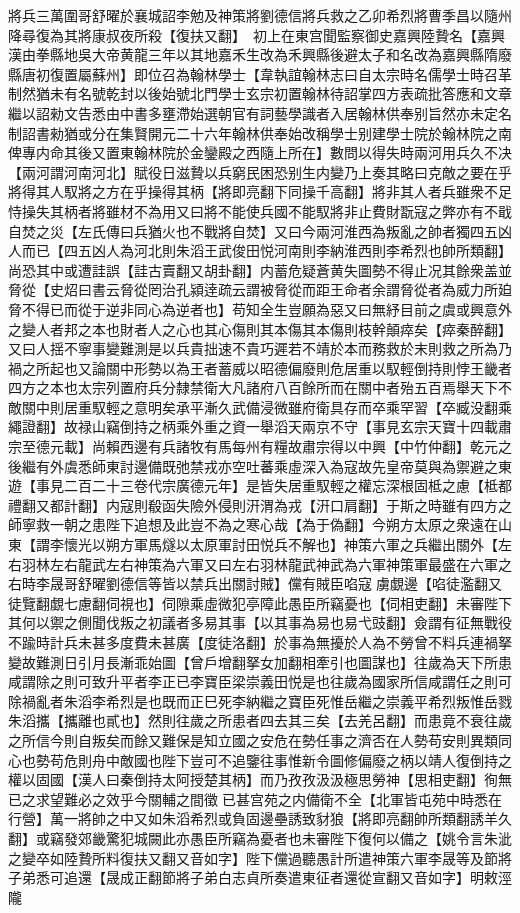 將兵三萬圍哥舒曜於襄城詔李勉及神策將劉德信將兵救之乙卯希烈將曹季昌以隨州降尋復為其將康叔夜所殺【復扶又翻】　初上在東宫聞監察御史嘉興陸贄名【嘉興漢由拳縣地吳大帝黄龍三年以其地嘉禾生改為禾興縣後避太子和名改為嘉興縣隋廢縣唐初復置屬蘇州】即位召為翰林學士【韋執誼翰林志曰自太宗時名儒學士時召革制然猶未有名號乾封以後始號北門學士玄宗初置翰林待詔掌四方表疏批答應和文章繼以詔勑文告悉由中書多壅滯始選朝官有詞藝學識者入居翰林供奉别旨然亦未定名制詔書勑猶或分在集賢開元二十六年翰林供奉始改稱學士别建學士院於翰林院之南俾專内命其後又置東翰林院於金鑾殿之西隨上所在】數問以得失時兩河用兵久不决【兩河謂河南河北】賦役日滋贄以兵窮民困恐别生内變乃上奏其略曰克敵之要在乎將得其人馭將之方在乎操得其柄【將即亮翻下同操千高翻】將非其人者兵雖衆不足恃操失其柄者將雖材不為用又曰將不能使兵國不能馭將非止費財翫寇之弊亦有不戢自焚之災【左氏傳曰兵猶火也不戰將自焚】又曰今兩河淮西為叛亂之帥者獨四五凶人而已【四五凶人為河北則朱滔王武俊田悦河南則李納淮西則李希烈也帥所類翻】尚恐其中或遭詿誤【詿古賣翻又胡卦翻】内蓄危疑蒼黄失圖勢不得止况其餘衆盖並脅從【史炤曰書云脅從罔治孔潁逹疏云謂被脅從而距王命者余謂脅從者為威力所廹脅不得已而從于逆非同心為逆者也】苟知全生豈願為惡又曰無紓目前之虞或興意外之變人者邦之本也財者人之心也其心傷則其本傷其本傷則枝幹顛瘁矣【瘁秦醉翻】又曰人揺不寧事變難測是以兵貴拙速不貴巧遲若不靖於本而務救於末則救之所為乃禍之所起也又論關中形勢以為王者蓄威以昭德偏廢則危居重以馭輕倒持則悖王畿者四方之本也太宗列置府兵分隸禁衛大凡諸府八百餘所而在關中者殆五百焉舉天下不敵關中則居重馭輕之意明矣承平漸久武備浸微雖府衛具存而卒乘罕習【卒臧没翻乘繩證翻】故禄山竊倒持之柄乘外重之資一舉滔天兩京不守【事見玄宗天寶十四載肅宗至德元載】尚賴西邊有兵諸牧有馬每州有糧故肅宗得以中興【中竹仲翻】乾元之後繼有外虞悉師東討邊備既弛禁戎亦空吐蕃乘虛深入為寇故先皇帝莫與為禦避之東遊【事見二百二十三卷代宗廣德元年】是皆失居重馭輕之權忘深根固柢之慮【柢都禮翻又都計翻】内寇則殽函失險外侵則汧渭為戎【汧口肩翻】于斯之時雖有四方之師寧救一朝之患陛下追想及此豈不為之寒心哉【為于偽翻】今朔方太原之衆遠在山東【謂李懷光以朔方軍馬燧以太原軍討田悦兵不解也】神策六軍之兵繼出關外【左右羽林左右龍武左右神策為六軍又曰左右羽林龍武神武為六軍神策軍最盛在六軍之右時李晟哥舒曜劉德信等皆以禁兵出關討賊】儻有賊臣啗寇虜覷邊【啗徒濫翻又徒覽翻覷七慮翻伺視也】伺隙乘虛微犯亭障此愚臣所竊憂也【伺相吏翻】未審陛下其何以禦之側聞伐叛之初議者多易其事【以其事為易也易弋豉翻】僉謂有征無戰役不踰時計兵未甚多度費未甚廣【度徒洛翻】於事為無擾於人為不勞曾不料兵連禍拏變故難測日引月長漸乖始圖【曾戶增翻拏女加翻相牽引也圖謀也】往歲為天下所患咸謂除之則可致升平者李正已李寶臣梁崇義田悦是也往歲為國家所信咸謂任之則可除禍亂者朱滔李希烈是也既而正巳死李納繼之寶臣死惟岳繼之崇義平希烈叛惟岳戮朱滔攜【攜離也貳也】然則往歲之所患者四去其三矣【去羌呂翻】而患竟不衰往歲之所信今則自叛矣而餘又難保是知立國之安危在勢任事之濟否在人勢苟安則異類同心也勢苟危則舟中敵國也陛下豈可不追鑒往事惟新令圖修偏廢之柄以靖人復倒持之權以固國【漢人曰秦倒持太阿授楚其柄】而乃孜孜汲汲極思勞神【思相吏翻】徇無已之求望難必之效乎今關輔之間徵已甚宫苑之内備衛不全【北軍皆屯苑中時悉在行營】萬一將帥之中又如朱滔希烈或負固邊壘誘致豺狼【將即亮翻帥所類翻誘羊久翻】或竊發郊畿驚犯城闕此亦愚臣所竊為憂者也未審陛下復何以備之【姚令言朱泚之變卒如陸贄所料復扶又翻又音如字】陛下儻過聽愚計所遣神策六軍李晟等及節將子弟悉可追還【晟成正翻節將子弟白志貞所奏遣東征者還從宣翻又音如字】明敕涇隴